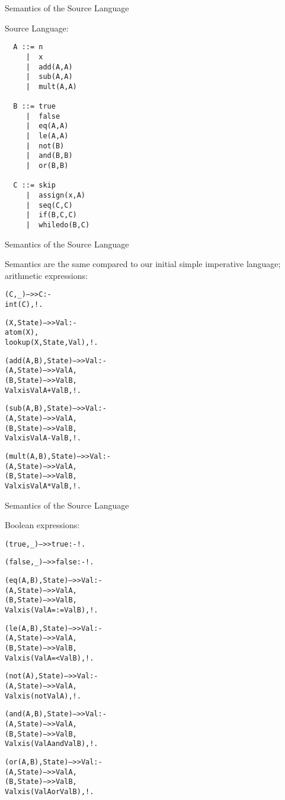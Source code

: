 \documentclass{beamer}
\begin{document}
\begin{frame}[fragile]{Semantics of the Source Language}

\scriptsize
Source Language:
\tiny
\begin{verbatim}
  A ::= n
     |  x
     |  add(A,A)
     |  sub(A,A)
     |  mult(A,A)

  B ::= true
     |  false
     |  eq(A,A)
     |  le(A,A)
     |  not(B)
     |  and(B,B)
     |  or(B,B)

  C ::= skip
     |  assign(x,A)
     |  seq(C,C)
     |  if(B,C,C)
     |  whiledo(B,C)
\end{verbatim}
\end{frame}

\begin{frame}[fragile]{Semantics of the Source Language}

\scriptsize
Semantics are the same compared to our initial simple imperative language; arithmetic
expressions:

\tiny
\begin{alltt}
(C,_) -->> C :-                    % constants
    int(C),!.

(X,State) -->> Val :-              % variables
    atom(X),
    lookup(X,State,Val),!.

(add(A,B),State) -->> Val :-       % addition
    (A,State) -->> ValA,
    (B,State) -->> ValB,
    Val xis ValA + ValB,!.

(sub(A,B),State) -->> Val :-       % subtraction
    (A,State) -->> ValA,
    (B,State) -->> ValB,
    Val xis ValA - ValB,!.

(mult(A,B),State) -->> Val :-     % multiplication
    (A,State) -->> ValA,
    (B,State) -->> ValB,
    Val xis ValA * ValB,!.
\end{alltt}
\end{frame}

\begin{frame}[fragile]{Semantics of the Source Language}

\scriptsize
Boolean
expressions:

\tiny
\begin{alltt}
(true,_) -->> true :- !.               % constants

(false,_) -->> false :- !.             % constants

(eq(A,B),State) -->> Val :-            % equality
    (A,State) -->> ValA,
    (B,State) -->> ValB,
    Val xis (ValA =:= ValB),!.

(le(A,B),State) -->> Val :-            % le
    (A,State) -->> ValA,
    (B,State) -->> ValB,
    Val xis (ValA =< ValB),!.

(not(A),State) -->> Val :-             % not
    (A,State) -->> ValA,
    Val xis (not ValA),!.

(and(A,B),State) -->> Val :-           % and
    (A,State) -->> ValA,
    (B,State) -->> ValB,
    Val xis (ValA and ValB),!.

(or(A,B),State) -->> Val :-            % or
    (A,State) -->> ValA,
    (B,State) -->> ValB,
    Val xis (ValA or ValB),!.
\end{alltt}
\end{frame}
\end{document}

